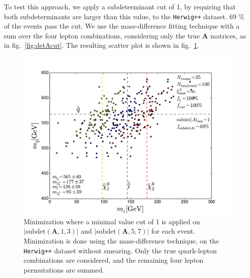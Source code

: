 \documentclass[twoside,english]{uiofysmaster}
\begin{document}
To test this approach, we apply a subdeterminant cut of 1, by requiring that both subdeterminants are larger than this value, to the {\tt Herwig++} dataset. 69 \% of the events pass the cut. We use the mass-difference fitting technique with a sum over the four lepton combinations, considering only the true $\mathbf A$ matrices, as in fig.\ \ref{fig:detAcut}. The resulting scatter plot is shown in fig.\ \ref{fig:subdetAcut}.
\begin{figure}[hbt]
	\centering
		\includegraphics[width=\textwidth]{figures/improving_combinatorics/4combosum_herwigpp-nosmear-noxisqcut-subdetAcut1.pdf} 
		\caption{ }

	\caption{Minimization where a minimal value cut of 1 is applied on $|\mathrm{subdet}(\mathbf A,1,3)|$ and $|\mathrm{subdet}(\mathbf A,5,7)|$ for each event. Minimization is done using the mass-difference technique, on the {\tt Herwig++} dataset without smearing. Only the true quark-lepton combinations are considered, and the remaining four lepton permutations are summed.%
	}
	\label{fig:subdetAcut}
\end{figure}
\end{document}
